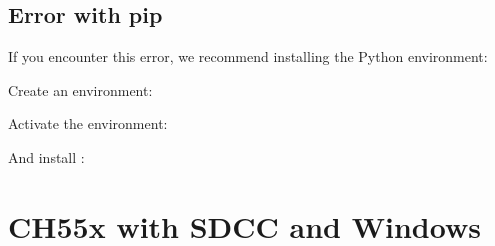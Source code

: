 \documentclass[letterpaper,10pt,english]{sphinxmanual}
\begin{document}
\section{Error with pip}
\label{\detokenize{install_linux:error-with-pip}}
\sphinxAtStartPar
If you encounter this error, we recommend installing the Python environment:

\begin{sphinxVerbatim}[commandchars=\\\{\}]
   
\end{sphinxVerbatim}

\sphinxAtStartPar
Create an environment:

\begin{sphinxVerbatim}[commandchars=\\\{\}]
   
\end{sphinxVerbatim}

\sphinxAtStartPar
Activate the environment:

\begin{sphinxVerbatim}[commandchars=\\\{\}]
 
\end{sphinxVerbatim}

\sphinxAtStartPar
And install :

\begin{sphinxVerbatim}[commandchars=\\\{\}]
  
\end{sphinxVerbatim}

\sphinxstepscope


\chapter{CH55x with SDCC and Windows}
\label{\detokenize{install_windows:ch55x-with-sdcc-and-windows}}\label{\detokenize{install_windows::doc}}
\end{document}
